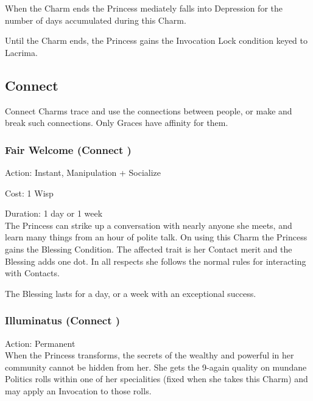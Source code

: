 When the Charm ends the Princess mediately falls into Depression for the number of days accumulated during this Charm. 
    
Until the Charm ends, the Princess gains the Invocation Lock condition keyed to Lacrima.

\subsection*{Connect}
Connect Charms trace and use the connections between people, or make and break such connections. Only Graces have affinity for them.

\subsubsection*{Fair Welcome (Connect \textbullet)}

\noindent Action: Instant, Manipulation + Socialize

\noindent Cost: 1 Wisp

\noindent Duration: 1 day or 1 week \\

\noindent The Princess can strike up a conversation with nearly anyone she meets, and learn many things from an hour of polite talk. On using this Charm the Princess gains the Blessing Condition. The affected trait is her Contact merit and the Blessing adds one dot. In all respects she follows the normal rules for interacting with Contacts.

The Blessing lasts for a day, or a week with an exceptional success.

\subsubsection*{Illuminatus (Connect \textbullet)}

\noindent Action: Permanent \\

When the Princess transforms, the secrets of the wealthy and powerful in her community cannot be hidden from her. She gets the 9-again quality on mundane Politics rolls within one of her specialities (fixed when she takes this Charm) and may apply an Invocation to those rolls.

